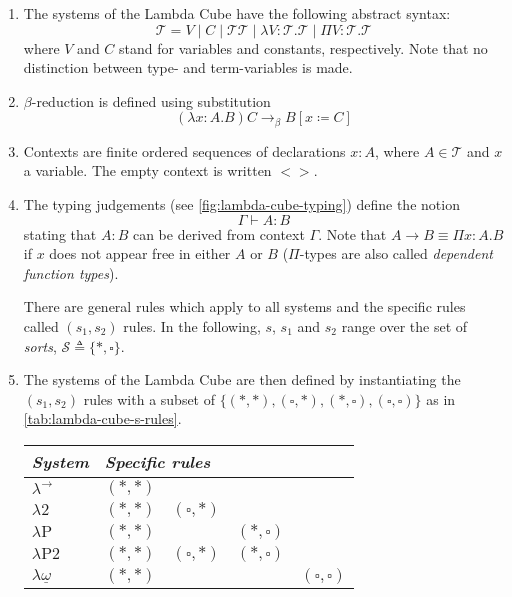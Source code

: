 \documentclass[12pt,toc=bibliography,numbers=noendperiod,
               footnotes=multiple,twoside]{scrartcl}
\begin{document}
\begin{enumerate}
\item The systems of the Lambda Cube have the following abstract syntax: \[\mathcal{T} = V \;|\; C \;|\; \mathcal{T}\mathcal{T} \;|\; \lambda V\!\!:\!\mathcal{T}\!.\mathcal{T} \;|\; \Pi V\!\!:\!\mathcal{T}\!.\mathcal{T}\] where \(V\) and \(C\) stand for variables and constants, respectively. Note that no distinction between type- and term-variables is made.
\item \(\beta\)-reduction is defined using substitution \[(\lambda x:A.B)C \rightarrow_\beta B[x \coloneqq C]\]
\item Contexts are finite ordered sequences of declarations \(x:A\), where \(A \in \mathcal{T}\) and \(x\) a variable. The empty context is written \(<>\).
\item The typing judgements (see \cref{fig:lambda-cube-typing}) define the notion \[\Gamma \vdash A:B\] stating that \(A:B\) can be derived from context \(\Gamma\). Note that \(A \rightarrow B \equiv \Pi x:A.B\) if \(x\) does not appear free in either \(A\) or \(B\) (\(\Pi\)-types are also called \emph{dependent function types}).

There are general rules which apply to all systems and the specific rules called \((s_1, s_2)\) rules. In the following, \(s\), \(s_1\) and \(s_2\) range over the set of \emph{sorts}, \(\mathcal{S} \triangleq \{*, \square\}\).
\item The systems of the Lambda Cube are then defined by instantiating the \((s_1, s_2)\) rules with a subset of \(\{(*,*), (\square, *), (*,\square), (\square, \square)\}\) as in \cref{tab:lambda-cube-s-rules}.

\begin{table}[h]
    \centering
    \begin{tabular}{l l l l l}
        \toprule
        \textit{System} & \multicolumn{4}{l}{\textit{Specific rules}}  \\
        \midrule
        \(\lambda^{\rightarrow}\) & \((*,*)\) & & & \\
        \(\lambda\textrm{2}\) & \((*,*)\) & \((\square, *)\) & & \\
        \(\lambda\textrm{P}\) & \((*,*)\) & & \((*,\square)\) & \\

        \(\lambda\textrm{P2}\) & \((*,*)\) & \((\square, *)\) & \((*,\square)\) & \\

        \(\lambda\underline{\omega}\) & \((*,*)\) & & & \((\square, \square)\) \\


\end{tabular}
\end{table}
\end{enumerate}
\end{document}
